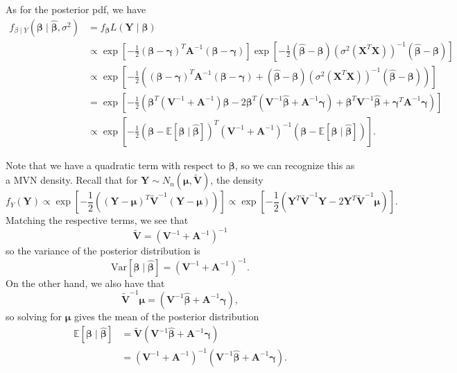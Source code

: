 \begin{enumerate}[a)]
As for the posterior pdf, we have 
\begin{align*}
    f_{\beta \mid Y}(\bm{\beta} \mid \hat{\bm{\beta}}, \sigma^2) &= f_{\bm{\beta}} L(\bm{Y} \mid \bm{\beta}) \\
    & \propto \exp \left[ -\frac{1}{2} (\bm{\beta} - \bm{\gamma})^T \bm{A}^{-1} (\bm{\beta} - \bm{\gamma}) \right] \exp \left[ -\frac{1}{2} (\hat{\bm{\beta}} - \bm{\beta})\left(\sigma^2(\bm{X}^T\bm{X})\right)^{-1}(\hat{\bm{\beta}} - \bm{\beta}) \right] \\
    & \propto \exp \left[ -\frac{1}{2} \left((\bm{\beta} - \bm{\gamma})^T \bm{A}^{-1} (\bm{\beta} - \bm{\gamma}) + (\hat{\bm{\beta}} - \bm{\beta})\left(\sigma^2(\bm{X}^T\bm{X})\right)^{-1}(\hat{\bm{\beta}} - \bm{\beta}) \right)\right] \\
    &= \exp \left[ -\frac{1}{2} \left(\bm{\beta}^T(\bm{V}^{-1} + \bm{A}^{-1})\bm{\beta} - 2\bm{\beta}^T (\bm{V}^{-1} \hat{\bm{\beta}} + \bm{A}^{-1} \bm{\gamma}) + \bm{\beta}^T \bm{V}^{-1} \hat{\bm{\beta}} + \bm{\gamma}^T \bm{A}^{-1}\bm{\gamma} \right) \right] \\
    & \propto \exp \left[ -\frac{1}{2} \left(\bm{\beta} - \mathbb{E}\left[\bm{\beta} \mid \hat{\bm{\beta}}\right] \right)^T (\bm{V}^{-1} + \bm{A}^{-1})^{-1} \left(\bm{\beta} - \mathbb{E}\left[\bm{\beta} \mid \hat{\bm{\beta}}\right] \right) \right].
\end{align*}

Note that we have a quadratic term with respect to $\bm{\beta}$, so we can recognize this as a MVN density. Recall that for $\bm{Y} \sim N_n(\bm{\mu}, \tilde{\bm{V}})$, the density
\[
    f_Y(\bm{Y}) \propto \exp \left[  -\frac{1}{2} \left( (\bm{Y} - \bm{\mu}) ^T \tilde{\bm{V}}^{-1} (\bm{Y} - \bm{\mu}) \right) \right] \propto \exp \left[ -\frac{1}{2} \left( \bm{Y}^T \tilde{\bm{V}}^{-1} \bm{Y} - 2 \bm{Y}^T \tilde{\bm{V}}^{-1} \bm{\mu} \right)  \right].
\]
Matching the respective terms, we see that 
\[
    \tilde{\bm{V}} = (\bm{V}^{-1} + \bm{A}^{-1})^{-1}
\]
so the variance of the posterior distribution is
\[
    \mathrm{Var} \left[\bm{\beta} \mid \hat{\bm{\beta}} \right] = (\bm{V}^{-1} + \bm{A}^{-1})^{-1}.
\]
On the other hand, we also have that
\[
    \tilde{\bm{V}}^{-1} \bm{\mu} = (\bm{V}^{-1} \hat{\bm{\beta}} + \bm{A}^{-1} \bm{\gamma}),
\]
so solving for $\bm{\mu}$ gives the mean of the posterior distribution
\begin{align*}
    \mathbb{E}\left[ \bm{\beta} \mid \hat{\bm{\beta}} \right] &= \tilde{\bm{V}}(\bm{V}^{-1} \hat{\bm{\beta}} + \bm{A}^{-1} \bm{\gamma}) \\
    &= (\bm{V}^{-1} + \bm{A}^{-1})^{-1}(\bm{V}^{-1} \hat{\bm{\beta}} + \bm{A}^{-1} \bm{\gamma}).
\end{align*}


\end{enumerate}
